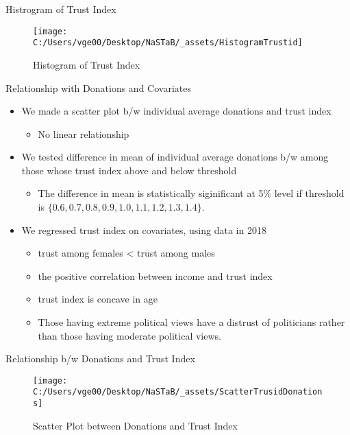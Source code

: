 \documentclass[
  ignorenonframetext,
]{beamer}
\providecommand{\tightlist}{%
  \setlength{\itemsep}{0pt}\setlength{\parskip}{0pt}}
\begin{document}
\begin{frame}{Histrogram of Trust Index}
\protect\hypertarget{histrogram-of-trust-index}{}
\begin{figure}
\texttt{[image: C:/Users/vge00/Desktop/NaSTaB/\_assets/HistogramTrustid]} \caption{Histogram of Trust Index}\label{fig:unnamed-chunk-3}
\end{figure}
\end{frame}

\begin{frame}{Relationship with Donations and Covariates}
\protect\hypertarget{relationship-with-donations-and-covariates}{}
\begin{itemize}
\tightlist
\item
  We made a scatter plot b/w individual average donations and trust
  index

  \begin{itemize}
  \tightlist
  \item
    No linear relationship
  \end{itemize}
\item
  We tested difference in mean of individual average donations b/w among
  those whose trust index above and below threshold

  \begin{itemize}
  \tightlist
  \item
    The difference in mean is statistically siginificant at 5\% level if
    threshold is \(\{0.6, 0.7, 0.8, 0.9, 1.0, 1.1, 1.2, 1.3, 1.4\}\).
  \end{itemize}
\item
  We regressed trust index on covariates, using data in 2018

  \begin{itemize}
  \tightlist
  \item
    trust among females \textless{} trust among males
  \item
    the positive correlation between income and trust index
  \item
    trust index is concave in age
  \item
    Those having extreme political views have a distrust of politicians
    rather than those having moderate political views.
  \end{itemize}
\end{itemize}
\end{frame}

\begin{frame}{Relationship b/w Donations and Trust Index}
\protect\hypertarget{relationship-bw-donations-and-trust-index}{}
\begin{figure}
\texttt{[image: C:/Users/vge00/Desktop/NaSTaB/\_assets/ScatterTrusidDonations]} \caption{Scatter Plot between Donations and Trust Index}\label{fig:unnamed-chunk-4}
\end{figure}
\end{frame}
\end{document}
